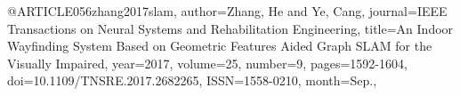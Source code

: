 @ARTICLE{056zhang2017slam,
author={Zhang, He and Ye, Cang},
journal={IEEE Transactions on Neural Systems and Rehabilitation Engineering}, 
title={An Indoor Wayfinding System Based on Geometric Features Aided Graph SLAM for the Visually Impaired}, 
year={2017},
volume={25},
number={9},
pages={1592-1604},
doi={10.1109/TNSRE.2017.2682265},
ISSN={1558-0210},
month={Sep.},}